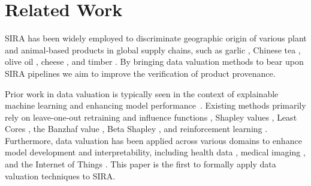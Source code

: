 \section{Related Work}
SIRA has been widely
employed to discriminate geographic origin of various
plant and animal-based products in global supply chains, such as garlic \cite{pianezze_geographical_2019}, Chinese tea \cite{liu_c_2020}, olive oil \cite{bontempo_characterisation_2019}, cheese \cite{camin_application_2004}, and timber \cite{mortier2024framework, truszkowski2025}. 
By bringing data valuation methods to bear upon
SIRA pipelines we aim to improve
the verification of product provenance.

Prior work in data valuation is typically
seen in the context of explainable machine learning and enhancing model performance~\cite{wu2024data, covert2024stochastic}. Existing methods primarily rely on leave-one-out retraining and influence functions \cite{koh2017understanding}, Shapley values \cite{jia2019towards, ghorbani2019data, shapley_jia_wang2023note}, Least Cores \cite{yan2021if}, the Banzhaf value \cite{banzhaf_wang2022data}, Beta Shapley \cite{kwon2021beta}, and reinforcement learning \cite{yoon2020data}. Furthermore, data valuation has been applied across various domains to enhance model development and interpretability, including health data \cite{health_pandl2021trustworthy}, medical imaging \cite{medical_image_tang2021data}, and the Internet of Things \cite{iot_shi2024data}. This paper
is the first to formally apply data
valuation techniques to SIRA.